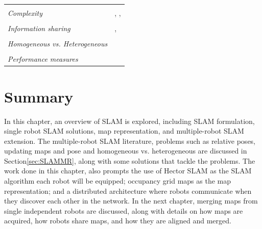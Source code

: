 \begin{table}[H]
\begin{tabular}{p{5cm}p{5.5cm}}
   & \\  
     {\em Complexity}               & 
    \cite{Howard2006a}, \cite{Balcilar2016}, \cite{Andersson2008}\\
    & \\  
     {\em Information sharing}         & 
    \cite{Carlone2010a}, \cite{Quraishi2016}\\
    & \\  
    {\em Homogeneous vs. Heterogeneous} & 
    \cite{VidalCalleja2011} \\
    & \\  
    {\em Performance measures}         & 
   \cite{Fenwick2003}\\
    \bottomrule[1.5pt]
\end{tabular}
\label{table:multisolution}
\end{table}

\section{Summary}
In this chapter, an overview of SLAM is explored, including SLAM formulation, single robot SLAM solutions, map representation, and multiple-robot SLAM extension. The multiple-robot SLAM literature, problems such as relative poses, updating maps and pose and homogeneous vs. heterogeneous are discussed in Section\ref{sec:SLAMMR}, along with some solutions that tackle the problems. The work done in this chapter, also prompts the use of Hector SLAM as the SLAM algorithm each robot will be equipped; occupancy grid maps as the map representation; and a distributed architecture where robots communicate when they discover each other in the network. In the next chapter, merging maps from single independent robots are discussed, along with details on how maps are acquired, how robots share maps, and how they are aligned and merged.

